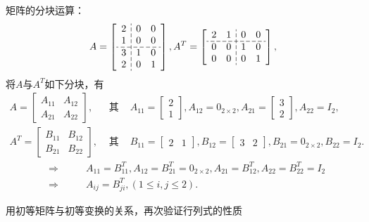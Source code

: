 \begin{eg}
矩阵的分块运算：
\[
  \setlength{\dashlinegap}{2pt}
  A = \left[ \begin{array}{c:cc}
    2 & 0 & 0 \\
    1 & 0 & 0 \\
    \hdashline
    3 & 1 & 0 \\
    2 & 0 & 1
  \end{array} \right],
  A^T = \left[ \begin{array}{cc:cc}
    2 & 1 & 0 & 0 \\
    \hdashline
    0 & 0 & 1 & 0 \\
    0 & 0 & 0 & 1
  \end{array} \right],
\]
将$A$与$A^T$如下分块，有
\begin{eqnarray*}
A = \begin{bmatrix}
A_{11} & A_{12} \\ A_{21} & A_{22}
\end{bmatrix},
& \text{ 其中 } &
A_{11} = \begin{bmatrix} 2 \\ 1 \end{bmatrix}, A_{12} = 0_{2\times 2}, A_{21} = \begin{bmatrix} 3 \\ 2 \end{bmatrix}, A_{22} = I_2, \\
A^T = \begin{bmatrix}
B_{11} & B_{12} \\ B_{21} & B_{22}
\end{bmatrix},
& \text{ 其中 } &
B_{11} = \begin{bmatrix} 2 & 1 \end{bmatrix}, B_{12} = \begin{bmatrix} 3 & 2 \end{bmatrix}, B_{21} = 0_{2\times 2}, B_{22} = I_2.
\end{eqnarray*}
\begin{eqnarray*}
& \Longrightarrow & \qquad A_{11} = B_{11}^T, A_{12} = B_{21}^T = 0_{2\times 2}, A_{21} = B_{12}^T, A_{22} = B_{22}^T = I_2 \\
& \Longrightarrow & \qquad A_{ij} = B_{ji}^T, (1 \leqslant i,j \leqslant 2).
\end{eqnarray*}
\end{eg}

\begin{eg}
用初等矩阵与初等变换的关系，再次验证行列式的性质
\end{eg}

